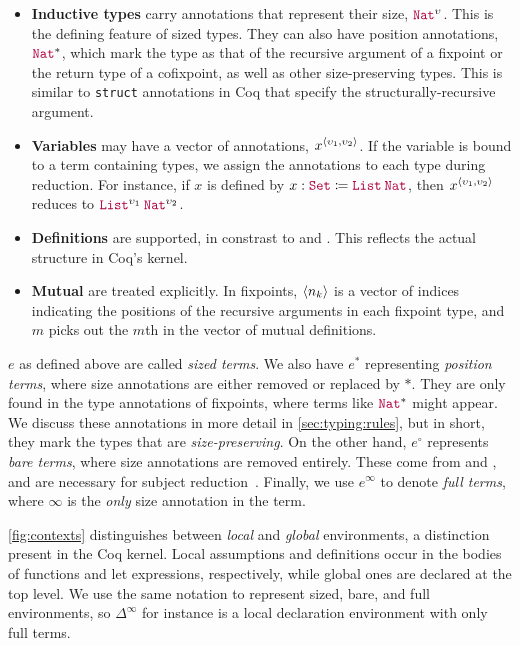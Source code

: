 \begin{itemize}
    \item \textbf{Inductive types} carry annotations that represent their size, \eg $\Nat^\upsilon$.
      This is the defining feature of sized types.
      They can also have position annotations, \eg $\Nat^*$, which mark the type as that of the recursive argument of a fixpoint or the return type of a cofixpoint, as well as other size-preserving types.
      This is similar to \texttt{struct} annotations in Coq that specify the structurally-recursive argument.
    \item \textbf{Variables} may have a vector of annotations, \eg $x^{\langle\upsilon_1, \upsilon_2\rangle}$.
      If the variable is bound to a term containing \coinductive types, we assign the annotations to each \coinductive type during reduction.
      For instance, if $x$ is defined by $x : \Set \coloneqq \app{\List}{\Nat}$, then $x^{\langle\upsilon_1, \upsilon_2\rangle}$ reduces to $\app{\List^{\upsilon_1}}{\const{Nat}^{\upsilon_2}}$.
    \item \textbf{Definitions} are supported, in constrast to \CIChat and \CIChatminus. This reflects the actual structure in Coq's kernel.
    \item \textbf{Mutual \cofixpoints} are treated explicitly.
      In fixpoints, $\langle n_k\rangle$ is a vector of indices indicating the positions of the recursive arguments in each fixpoint type, and $m$ picks out the $m$th \cofixpoint in the vector of mutual definitions.
\end{itemize}

$e$ as defined above are called \textit{sized terms}.
We also have $e^*$ representing \textit{position terms},
where size annotations are either removed or replaced by $*$.
They are only found in the type annotations of fixpoints,
where terms like $\Nat^*$ might appear.
We discuss these annotations in more detail in \autoref{sec:typing:rules},
but in short, they mark the types that are \textit{size-preserving}.
On the other hand, $e^\circ$ represents \textit{bare terms},
where size annotations are removed entirely.
These come from \CIChatminus and \CIChat, and are necessary for subject reduction~\citep{cic-hat-minus}.
Finally, we use $e^\infty$ to denote \textit{full terms},
where $\infty$ is the \emph{only} size annotation in the term.



\autoref{fig:contexts} distinguishes between \textit{local} and \textit{global} environments, a distinction present in the Coq kernel.
Local assumptions and definitions occur in the bodies of functions and let expressions, respectively, while global ones are declared at the top level.
We use the same notation to represent sized, bare, and full environments,
so $\Delta^\infty$ for instance is a local declaration environment with only full terms.

